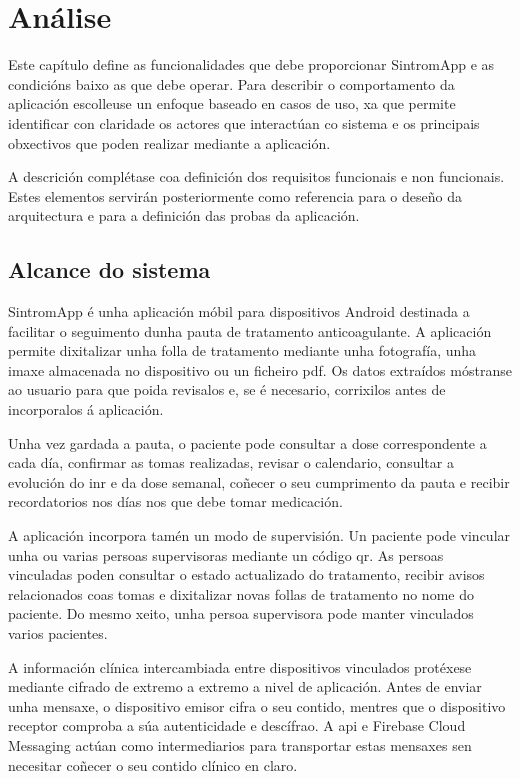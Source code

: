 \chapter{Análise}
\label{chap:Analise}

Este capítulo define as funcionalidades que debe proporcionar SintromApp e as condicións baixo as que debe operar. Para describir o comportamento da aplicación escolleuse un enfoque baseado en casos de uso, xa que permite identificar con claridade os actores que interactúan co sistema e os principais obxectivos que poden realizar mediante a aplicación.

A descrición complétase coa definición dos requisitos funcionais e non funcionais. Estes elementos servirán posteriormente como referencia para o deseño da arquitectura e para a definición das probas da aplicación.

\section{Alcance do sistema}
\label{sec:alcance-sistema}

SintromApp é unha aplicación móbil para dispositivos Android destinada a facilitar o seguimento dunha pauta de tratamento anticoagulante. A aplicación permite dixitalizar unha folla de tratamento mediante unha fotografía, unha imaxe almacenada no dispositivo ou un ficheiro \gls{pdf}. Os datos extraídos móstranse ao usuario para que poida revisalos e, se é necesario, corrixilos antes de incorporalos á aplicación.

Unha vez gardada a pauta, o paciente pode consultar a dose correspondente a cada día, confirmar as tomas realizadas, revisar o calendario, consultar a evolución do \gls{inr} e da dose semanal, coñecer o seu cumprimento da pauta e recibir recordatorios nos días nos que debe tomar medicación.

A aplicación incorpora tamén un modo de supervisión. Un paciente pode vincular unha ou varias persoas supervisoras mediante un código \gls{qr}. As persoas vinculadas poden consultar o estado actualizado do tratamento, recibir avisos relacionados coas tomas e dixitalizar novas follas de tratamento no nome do paciente. Do mesmo xeito, unha persoa supervisora pode manter vinculados varios pacientes.

A información clínica intercambiada entre dispositivos vinculados protéxese mediante cifrado de extremo a extremo a nivel de aplicación. Antes de enviar unha mensaxe, o dispositivo emisor cifra o seu contido, mentres que o dispositivo receptor comproba a súa autenticidade e descífrao. A \gls{api} e Firebase Cloud Messaging actúan como intermediarios para transportar estas mensaxes sen necesitar coñecer o seu contido clínico en claro.

